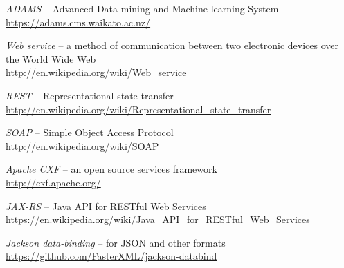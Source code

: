 
\begin{thebibliography}{999}

		\textit{ADAMS} -- Advanced Data mining and Machine learning System \\
		{\scriptsize \url{https://adams.cms.waikato.ac.nz/}{}}
		
		\textit{Web service} -- a method of communication between two electronic 
		devices over the World Wide Web \\
		{\scriptsize \url{http://en.wikipedia.org/wiki/Web_service}{}}
		
		\textit{REST} -- Representational state transfer \\
		{\scriptsize \url{http://en.wikipedia.org/wiki/Representational_state_transfer}{}}

		\textit{SOAP} -- Simple Object Access Protocol \\
		\url{http://en.wikipedia.org/wiki/SOAP}{}

		\textit{Apache CXF} -- an open source services framework \\
		{\scriptsize \url{http://cxf.apache.org/}{}}
		
		\textit{JAX-RS} -- Java API for RESTful Web Services \\
		{\scriptsize \url{https://en.wikipedia.org/wiki/Java_API_for_RESTful_Web_Services}{}}

		\textit{Jackson data-binding} -- for JSON and other formats \\
		{\scriptsize \url{https://github.com/FasterXML/jackson-databind}{}}

\end{thebibliography}

